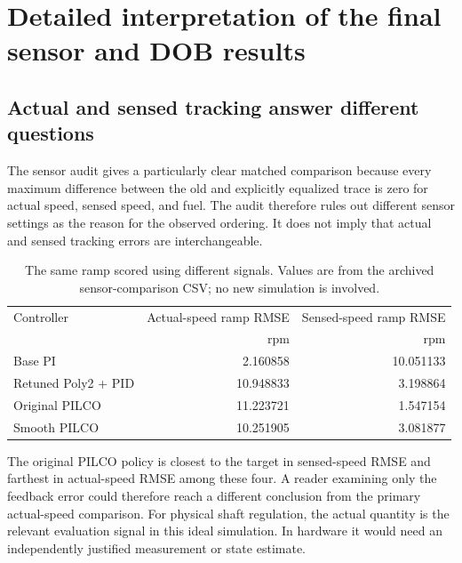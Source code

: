 \chapter{Detailed interpretation of the final sensor and DOB results}
\section{Actual and sensed tracking answer different questions}
The sensor audit gives a particularly clear matched comparison because every maximum difference between the old and explicitly equalized trace is zero for actual speed, sensed speed, and fuel. The audit therefore rules out different sensor settings as the reason for the observed ordering. It does not imply that actual and sensed tracking errors are interchangeable.
\begin{table}[htbp]\centering\small
\begin{tabular}{lrr}\toprule Controller & Actual-speed ramp RMSE & Sensed-speed ramp RMSE\\ & rpm & rpm\\\midrule
Base PI & 2.160858 & 10.051133\\
Retuned Poly2 + PID & 10.948833 & 3.198864\\
Original PILCO & 11.223721 & 1.547154\\
Smooth PILCO & 10.251905 & 3.081877\\\bottomrule
\end{tabular}\caption{The same ramp scored using different signals. Values are from the archived sensor-comparison CSV; no new simulation is involved.}\end{table}
The original PILCO policy is closest to the target in sensed-speed RMSE and farthest in actual-speed RMSE among these four. A reader examining only the feedback error could therefore reach a different conclusion from the primary actual-speed comparison. For physical shaft regulation, the actual quantity is the relevant evaluation signal in this ideal simulation. In hardware it would need an independently justified measurement or state estimate.


